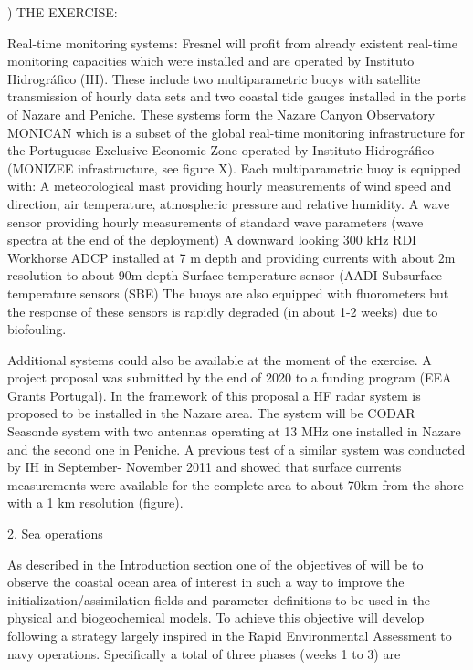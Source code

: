 ) THE EXERCISE:
 
Real-time monitoring systems:
Fresnel will profit from already existent real-time monitoring capacities which were installed and are operated by Instituto Hidrográfico (IH). These include two multiparametric buoys with satellite transmission of hourly data sets and two coastal tide gauges installed in the ports of Nazare and Peniche. These systems form the Nazare Canyon Observatory MONICAN which is a subset of the global real-time monitoring infrastructure for the Portuguese Exclusive Economic Zone operated by Instituto Hidrográfico (MONIZEE infrastructure, see figure X). Each multiparametric buoy is equipped with:
 A meteorological mast providing hourly measurements of wind speed and direction, air temperature, atmospheric pressure and relative humidity.
A wave sensor providing hourly measurements of standard wave parameters (wave spectra at the end of the deployment)
A downward looking 300 kHz RDI Workhorse ADCP installed at 7 m depth and providing currents with about 2m resolution to about 90m depth
Surface temperature sensor (AADI
Subsurface temperature sensors (SBE)
 The buoys are also equipped with fluorometers but the response of these sensors is rapidly degraded (in about 1-2 weeks) due to biofouling.

Additional systems could also be available at the moment of the exercise. A project proposal was submitted by the end of 2020 to a funding program (EEA Grants Portugal). In the framework of this proposal a HF radar system is proposed to be installed in the Nazare area. The system will be CODAR Seasonde system with two antennas operating at 13 MHz one installed in Nazare and the second one in Peniche. A previous test of a similar system was conducted by IH in September- November 2011 and showed that surface currents measurements were available for the complete area to about 70km from the shore with a 1 km resolution (figure).
 
 
 
 
 
 
2. Sea operations
 
As described in the Introduction section one of the objectives of \pro
will be to observe the coastal ocean area of interest in such a way to
improve the initialization/assimilation fields and parameter definitions
to be used in the physical and biogeochemical models. To achieve this
objective \pro will develop following a strategy largely inspired in the
Rapid Environmental Assessment to navy operations.  Specifically a total
of three phases (weeks 1 to 3) are
 
